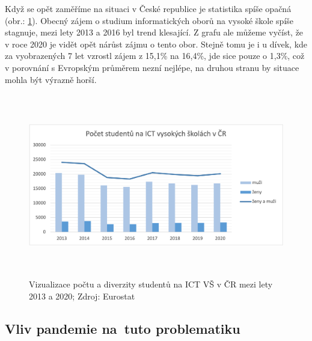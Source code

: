 \documentclass[12pt]{report}			%
\begin{document}
            Když se opět zaměříme na situaci v České republice je statistika spíše opačná (obr.: \ref{fig:ICT_CZ}). Obecný zájem o studium informatických oborů na vysoké škole spíše stagnuje, mezi lety 2013 a 2016 byl trend klesající. Z grafu ale můžeme vyčíst, že v roce 2020 je vidět opět nárůst zájmu o tento obor. Stejně tomu je i u dívek, kde za vyobrazených 7 let vzrostl zájem z 15,1\% na 16,4\%, jde sice pouze o 1,3\%, což v porovnání s Evropským průměrem nezní nejlépe, na druhou stranu by situace mohla být výrazně horší. \cite{StudentsTeritaryEducation}
            \begin{figure}[h]
                \centering
                \includegraphics[width=16cm, height=8cm]{Maturitni Prace/images/ICT_CZ.png}
                \caption[Vizualizace diverzity na ICT VŠ v ČR 2013/20]{Vizualizace počtu a diverzity studentů na ICT VŠ v ČR mezi lety 2013 a 2020; Zdroj: Eurostat}
                \label{fig:ICT_CZ}
            \end{figure}
            
            \newpage
        \subsection {Vliv pandemie na~tuto problematiku}
            
\end{document}

